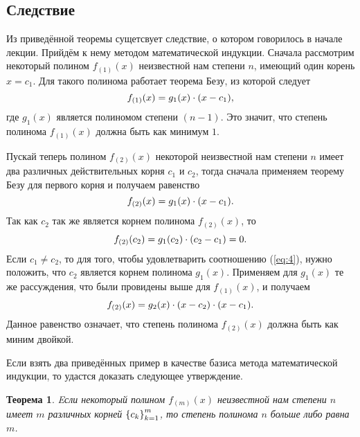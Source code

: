 \documentclass[12pt]{article}
\newtheorem{theorem}{Теорема}[section]
\begin{document}
\subsection{Следствие}
Из приведённой теоремы сущетсвует следствие, о котором говорилось в начале лекции. Прийдём к нему методом математической индукции. Сначала рассмотрим некоторый полином $f_{(1)}(x)$ неизвестной нам степени $n$, имеющий один корень $x=c_1$. Для такого полинома работает теорема Безу, из которой следует
\begin{equation}
  f_{(1)}(x) = g_1(x)\cdot \qty(x-c_1),
\end{equation}
где $g_1(x)$ является полиномом степени $(n-1)$. Это значит, что степень полинома $f_{(1)}(x)$ должна быть как минимум $1$. 
\par 
Пускай теперь полином $f_{(2)}(x)$ некоторой неизвестной нам степени $n$ имеет два различных действительных корня $c_1$ и $c_2$, тогда сначала применяем теорему Безу для первого корня и получаем равенство
\begin{equation}
  f_{(2)}(x) = g_1(x)\cdot \qty(x-c_1).
\end{equation}
Так как $c_2$ так же является корнем полинома $f_{(2)}(x)$, то 
\begin{equation}
\label{eq:4}
  f_{(2)}(c_2) = g_1(c_2)\cdot \qty(c_2-c_1) = 0.
\end{equation}
Если $c_1 \ne c_2$, то для того, чтобы удовлетварить соотношению (\ref{eq:4}), нужно положить, что $c_2$ является корнем полинома $g_1(x)$. Применяем для $g_1(x)$ те же рассуждения, что были провидены выше для $f_{(1)}(x)$, и получаем
\begin{equation}
  f_{(2)}(x) = g_2(x)\cdot \qty(x-c_2)\cdot \qty(x-c_1).
\end{equation}
Данное равенство означает, что степень полинома $f_{(2)}(x)$ должна быть как миним двойкой.
\par
Если взять два приведённых пример в качестве базиса метода математической индукции, то удастся доказать следующее утверждение.
\begin{theorem}
  Eсли некоторый полином $f_{(m)}(x)$ неизвестной нам степени $n$ имеет $m$ различных корней $\qty{c_k}_{k=1}^m$, то степень полинома $n$ больше либо равна $m$.
\end{theorem}
\end{document}
